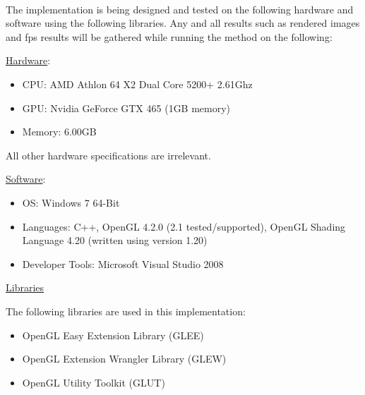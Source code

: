 \paragraph{}
The implementation is being designed and tested on the following hardware and software using the following libraries.  Any and all results such as rendered images and fps results will be gathered while running the method on the following:
\vspace{5 mm}

\hspace{12mm}\underline{Hardware}:
\begin{itemize}
\setlength{\itemindent}{2.5em}
\item CPU: AMD Athlon 64 X2 Dual Core 5200+ 2.61Ghz
\item GPU: Nvidia GeForce GTX 465 (1GB memory)
\item Memory: 6.00GB
\end{itemize}

\hspace{12mm}All other hardware specifications are irrelevant.
\vspace{5 mm}

\hspace{12mm}\underline{Software}:
\begin{itemize}
\setlength{\itemindent}{2.5em}
\item OS: Windows 7 64-Bit
\item Languages: C++, OpenGL 4.2.0 (2.1 tested/supported), OpenGL Shading Language 4.20 (written using version 1.20)
\item Developer Tools: Microsoft Visual Studio 2008
\end{itemize}
\vspace{5 mm}

\hspace{12mm}\underline{Libraries}

\vspace{1 mm}

\hspace{12mm}The following libraries are used in this implementation:

\begin{itemize}
\setlength{\itemindent}{2.5em}
\item OpenGL Easy Extension Library (GLEE)
\item OpenGL Extension Wrangler Library (GLEW)
\item OpenGL Utility Toolkit (GLUT)
\end{itemize}


